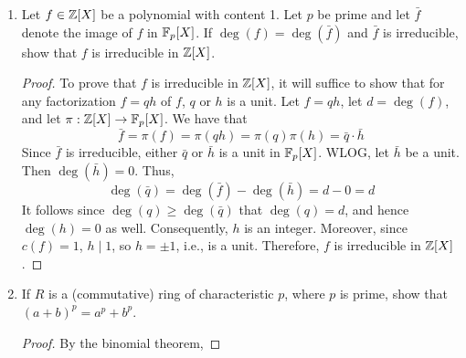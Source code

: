 \documentclass[../psets.tex]{subfiles}
\begin{document}
\begin{enumerate}
\begin{enumerate}
\begin{proof}[Answer]
            True.
        \end{proof}
        \item Let $K$ be the field of fractions of an integral domain $R$. If $D_1,D_2$ are multiplicative subsets of $R$, then $D_1^{-1}R$ and $D_2^{-1}R$ are subrings of $K$. If $D_1^{-1}R=D_2^{-1}R$, then $D_1=D_2$.
        \begin{proof}[Answer]
            False.\par
            Let $R=\Z$. Pick $D_1=\N$ and $D_2=\Z-\{0\}$. Then since $D_1\subset D_2$, any $a/b\in D_1^{-1}R$. If $a/b\in D_2^{-1}R$, then we divide into two cases. If the denominator is positive, we are done. If the denominator is negative, represent the fraction by another member of the equivalence class: $-a/-b\in D_1^{-1}R$.
        \end{proof}
    \end{enumerate}
    \item Let $f\in\mathbb{Z}[X]$ be a polynomial with content 1. Let $p$ be prime and let $\bar{f}$ denote the image of $f$ in $\mathbb{F}_p[X]$. If $\deg(f)=\deg(\bar{f})$ and $\bar{f}$ is irreducible, show that $f$ is irreducible in $\mathbb{Z}[X]$.
    \begin{proof}
        To prove that $f$ is irreducible in $\mathbb{Z}[X]$, it will suffice to show that for any factorization $f=qh$ of $f$, $q$ or $h$ is a unit. Let $f=qh$, let $d=\deg(f)$, and let $\pi:\mathbb{Z}[X]\to\mathbb{F}_p[X]$. We have that
        \begin{equation*}
            \bar{f} = \pi(f)
            = \pi(qh)
            = \pi(q)\pi(h)
            = \bar{q}\cdot\bar{h}
        \end{equation*}
        Since $\bar{f}$ is irreducible, either $\bar{q}$ or $\bar{h}$ is a unit in $\mathbb{F}_p[X]$. WLOG, let $\bar{h}$ be a unit. Then $\deg(\bar{h})=0$. Thus,
        \begin{equation*}
            \deg(\bar{q}) = \deg(\bar{f})-\deg(\bar{h})
            = d-0
            = d
        \end{equation*}
        It follows since $\deg(q)\geq\deg(\bar{q})$ that $\deg(q)=d$, and hence $\deg(h)=0$ as well. Consequently, $h$ is an integer. Moreover, since $c(f)=1$, $h\mid 1$, so $h=\pm 1$, i.e., is a unit. Therefore, $f$ is irreducible in $\mathbb{Z}[X]$.
    \end{proof}
    \item If $R$ is a (commutative) ring of characteristic $p$, where $p$ is prime, show that $(a+b)^p=a^p+b^p$.
    \begin{proof}
        By the binomial theorem,

\end{proof}
\end{enumerate}
\end{document}
